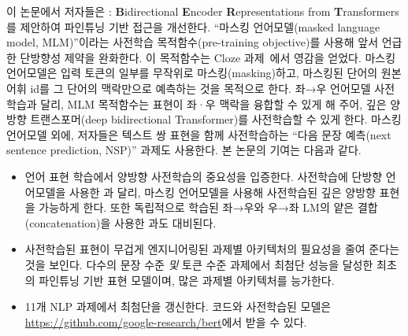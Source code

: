 이 논문에서 저자들은 \bert: \textbf{B}idirectional \textbf{E}ncoder \textbf{R}epresentations from \textbf{T}ransformers를 제안하여 파인튜닝 기반 접근을 개선한다.  ``마스킹 언어모델(masked language model, MLM)''이라는 사전학습 목적함수(pre-training objective)를 사용해 앞서 언급한 단방향성 제약을 완화한다. 이 목적함수는 Cloze 과제~\cite{taylor:1953:_cloze}에서 영감을 얻었다. 마스킹 언어모델은 입력 토큰의 일부를 무작위로 마스킹(masking)하고, 마스킹된 단어의 원본 어휘 id를 그 단어의 맥락만으로 예측하는 것을 목적으로 한다. 좌→우 언어모델 사전학습과 달리, MLM 목적함수는 표현이 좌·우 맥락을 융합할 수 있게 해 주어, 깊은 양방향 트랜스포머(deep bidirectional Transformer)를 사전학습할 수 있게 한다. 마스킹 언어모델 외에, 저자들은 텍스트 쌍 표현을 함께 사전학습하는 ``다음 문장 예측(next sentence prediction, NSP)'' 과제도 사용한다. 본 논문의 기여는 다음과 같다.
\begin{itemize}[leftmargin=1em]
  \item 언어 표현 학습에서 양방향 사전학습의 중요성을 입증한다. 사전학습에 단방향 언어모델을 사용한 \citet{radford-etal:2018}과 달리,  마스킹 언어모델을 사용해 사전학습된 깊은 양방향 표현을 가능하게 한다. 또한 독립적으로 학습된 좌→우와 우→좌 LM의 얕은 결합(concatenation)을 사용한 \citet{peters-etal:2018:_deep}과도 대비된다.
  \item 사전학습된 표현이 무겁게 엔지니어링된 과제별 아키텍처의 필요성을 줄여 준다는 것을 보인다.  다수의 문장 수준 \emph{및} 토큰 수준 과제에서 최첨단 성능을 달성한 최초의 파인튜닝 기반 표현 모델이며, 많은 과제별 아키텍처를 능가한다.
  \item {} 11개 NLP 과제에서 최첨단을 갱신한다. 코드와 사전학습된 모델은 \url{https://github.com/google-research/bert}에서 받을 수 있다.
\end{itemize}
